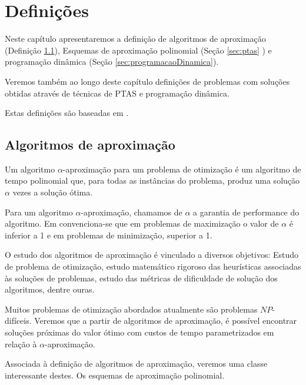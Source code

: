 \chapter{Definições}
\label{chap:defs}

Neste capítulo apresentaremos a definição de algoritmos de aproximação (Definição \ref{sec:algAProximacao}), Esquemas de aproximação polinomial (Seção \ref{sec:ptas} ) e programação dinâmica (Seção \ref{sec:programacaoDinamica}). 

Veremos também ao longo deste capítulo definições de problemas com soluções obtidas através de técnicas de PTAS e programação dinâmica.

Estas definições são baseadas em \cite{Williamson}.

\section{Algoritmos de aproximação}

\label{sec:algAProximacao}

\begin{definition}

\label{definition:algAproximacao}

Um algoritmo $\alpha$-aproximação para um problema de otimização é um algoritmo de tempo polinomial que, para todas as instâncias do problema, produz uma solução $\alpha$ vezes a solução ótima.

\end{definition}

Para um algoritmo $\alpha$-aproximação, chamamos de $\alpha$ a garantia de performance do algoritmo. Em \cite{Williamson} convenciona-se que em problemas de maximização o valor de $\alpha$ é inferior a 1 e em problemas de minimização, superior a 1.

O estudo dos algoritmos de aproximação é vinculado a diversos objetivos: Estudo de problema de otimização, estudo matemático rigoroso das heurísticas associadas às soluções de problemas, estudo das métricas de dificuldade de solução dos algoritmos, dentre ouras. 

Muitos problemas de otimização abordados atualmente são problemas $NP$-difíceis. Veremos que a partir de algoritmos de aproximação, é possível encontrar soluções próximas do valor ótimo com custos de tempo parametrizados em relação à $\alpha$-aproximação.

Associada à definição de algoritmos de aproximação, veremos uma classe interessante destes. Os esquemas de aproximação polinomial.

